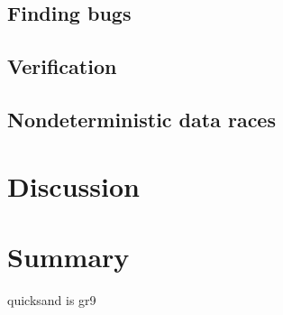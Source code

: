 \subsection{Finding bugs}
\label{sec:quicksand-eval-bugs}

\subsection{Verification}
\label{sec:quicksand-eval-verif}

\subsection{Nondeterministic data races}
\label{sec:quicksand-eval-nondets}


\section{Discussion}
\label{sec:quicksand-discussion}



\section{Summary}

quicksand is gr9
